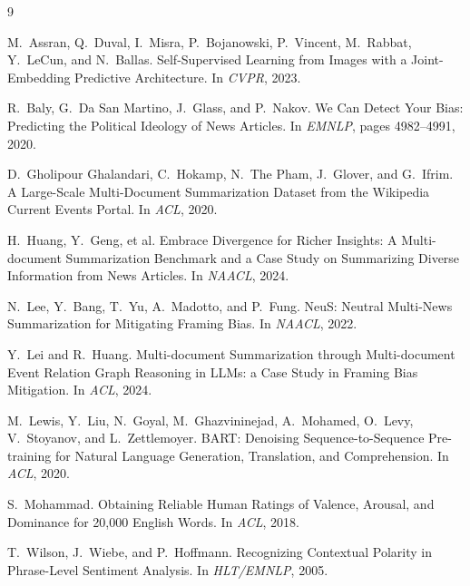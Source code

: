 \documentclass[10pt,twocolumn,a4paper]{article}
\begin{document}
\begin{thebibliography}{9}
\small

M.~Assran, Q.~Duval, I.~Misra, P.~Bojanowski, P.~Vincent, M.~Rabbat,
Y.~LeCun, and N.~Ballas.
\newblock Self-Supervised Learning from Images with a Joint-Embedding
Predictive Architecture.
\newblock In \emph{CVPR}, 2023.

R.~Baly, G.~Da San Martino, J.~Glass, and P.~Nakov.
\newblock We Can Detect Your Bias: Predicting the Political Ideology of News
Articles.
\newblock In \emph{EMNLP}, pages 4982--4991, 2020.

D.~Gholipour Ghalandari, C.~Hokamp, N.~The Pham, J.~Glover, and G.~Ifrim.
\newblock A Large-Scale Multi-Document Summarization Dataset from the Wikipedia
Current Events Portal.
\newblock In \emph{ACL}, 2020.

H.~Huang, Y.~Geng, et al.
\newblock Embrace Divergence for Richer Insights: A Multi-document
Summarization Benchmark and a Case Study on Summarizing Diverse Information
from News Articles.
\newblock In \emph{NAACL}, 2024.

N.~Lee, Y.~Bang, T.~Yu, A.~Madotto, and P.~Fung.
\newblock NeuS: Neutral Multi-News Summarization for Mitigating Framing Bias.
\newblock In \emph{NAACL}, 2022.

Y.~Lei and R.~Huang.
\newblock Multi-document Summarization through Multi-document Event Relation
Graph Reasoning in LLMs: a Case Study in Framing Bias Mitigation.
\newblock In \emph{ACL}, 2024.

M.~Lewis, Y.~Liu, N.~Goyal, M.~Ghazvininejad, A.~Mohamed, O.~Levy,
V.~Stoyanov, and L.~Zettlemoyer.
\newblock BART: Denoising Sequence-to-Sequence Pre-training for Natural
Language Generation, Translation, and Comprehension.
\newblock In \emph{ACL}, 2020.

S.~Mohammad.
\newblock Obtaining Reliable Human Ratings of Valence, Arousal, and Dominance
for 20,000 English Words.
\newblock In \emph{ACL}, 2018.

T.~Wilson, J.~Wiebe, and P.~Hoffmann.
\newblock Recognizing Contextual Polarity in Phrase-Level Sentiment Analysis.
\newblock In \emph{HLT/EMNLP}, 2005.

\end{thebibliography}
\end{document}
